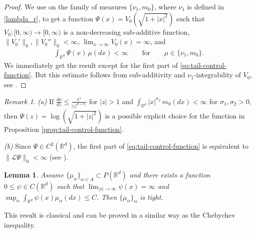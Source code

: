 \documentclass[a4paper,  twoside, 10pt, leqno]{amsart}
\newcommand{\rd}{\mathbb{R}^d}
\newtheorem{lemma}[thm]{Lemma}
\theoremstyle{remark}
\newtheorem{remark}[thm]{Remark}
\theoremstyle{definition}
\begin{document}
\begin{proof}
We use \cite[Lemma 4.9]{Espen-Indra-Milosz-2020} on the family of measures $\{\nu_1 , m_0\}$, where $\nu_1$ is defined in \eqref{lambda_r}, to get  
 a function $\Psi(x) = V_0(\sqrt{1+|x|^2})$ such that $V_0:[0,\infty)\rightarrow [0,\infty)$ is a non-decreasing sub-additive function, $\|V_0'\|_{0}, \|V_0''\|_0<\infty$, $\displaystyle \lim_{x\rightarrow \infty} V_0(x) = \infty$,  and 
\begin{align*}
\int_{\rd} \Psi(x) \, \mu(dx)<\infty \qquad \mbox{for} \qquad \mu\in \{\nu_1 , m_0\}. 
\end{align*}
We immediately get the result except for the first part of \eqref{eq:tail-control-function}. But this estimate follows from sub-additivity and $\nu_1$-integrability of $V_0$, see \cite[Lemma 4.13 (ii)]{Espen-Indra-Milosz-2020}.
\end{proof}



\begin{remark}
\textit{(a)} If  $\frac{d\nu}{dz}\leq \frac{C}{|z|^{d+\sigma_1}}$ for $|z|>1$ and $\int_{\rd} |x|^{\sigma_2} \, m_0(dx)< \infty$ for $\sigma_1,\sigma_2>0$, then  $\Psi(z)= \log(\sqrt{1+|z|^2})$ is a possible
explicit choice for the function in Proposition \ref{prop:tail-control-function}.
 \smallskip 

\noindent \textit{(b)} 
Since $\Psi \in C^2(\rd)$, the first part of   \eqref{eq:tail-control-function} is equivalent to  $\|\mathcal{L}\Psi\|_0 < \infty$ (see \cite[Lemma 4.13 (ii)]{Espen-Indra-Milosz-2020}).
\end{remark} 

\begin{lemma}
Assume $\{\mu_\alpha\}_{\alpha\in A}\subset P(\rd)$ and there exists a function $0\leq \psi \in C(\rd)$ such that $\lim_{|x|\rightarrow \infty} \psi(x)=\infty$ and  $\sup_{\alpha}\int_{\rd} \psi(x) \mu_\alpha(dx) \leq C$. Then $\{\mu_\alpha\}_{\alpha}$ is tight. 
\end{lemma}
This result is classical and can be proved in a similar way as the Chebychev inequality. 
\end{document}
